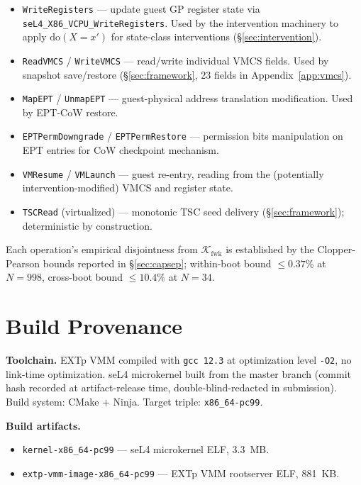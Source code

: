 \documentclass[conference]{IEEEtran}
\newcommand{\Kfwk}{\mathcal{K}_\text{fwk}}
\newcommand{\dox}[1]{\text{do}(X{=}#1)}
\begin{document}
\begin{itemize}[itemsep=2pt,topsep=2pt,leftmargin=*]
\item \texttt{WriteRegisters} --- update guest GP register state
  via \texttt{seL4\_X86\_VCPU\_WriteRegisters}. Used by the
  intervention machinery to apply $\dox{x'}$ for state-class
  interventions (\S\ref{sec:intervention}).
\item \texttt{ReadVMCS} / \texttt{WriteVMCS} --- read/write
  individual VMCS fields. Used by snapshot save/restore
  (\S\ref{sec:framework}, 23 fields in Appendix~\ref{app:vmcs}).
\item \texttt{MapEPT} / \texttt{UnmapEPT} --- guest-physical
  address translation modification. Used by EPT-CoW restore.
\item \texttt{EPTPermDowngrade} / \texttt{EPTPermRestore} ---
  permission bits manipulation on EPT entries for CoW
  checkpoint mechanism.
\item \texttt{VMResume} / \texttt{VMLaunch} --- guest re-entry,
  reading from the (potentially intervention-modified) VMCS and
  register state.
\item \texttt{TSCRead} (virtualized) --- monotonic TSC seed
  delivery (\S\ref{sec:framework}); deterministic by construction.
\end{itemize}

Each operation's empirical disjointness from $\Kfwk$ is established
by the Clopper-Pearson bounds reported in \S\ref{sec:capsep};
within-boot bound $\leq 0.37\%$ at $N{=}998$, cross-boot bound
$\leq 10.4\%$ at $N{=}34$.

\section{Build Provenance}\label{app:build}

\textbf{Toolchain.} EXTp VMM compiled with \texttt{gcc 12.3} at
optimization level \texttt{-O2}, no link-time optimization.
seL4 microkernel built from the master branch (commit hash
recorded at artifact-release time, double-blind-redacted in
submission). Build system: CMake + Ninja. Target triple:
\texttt{x86\_64-pc99}.

\textbf{Build artifacts.}
\begin{itemize}[itemsep=2pt,topsep=2pt,leftmargin=*]
\item \texttt{kernel-x86\_64-pc99} --- seL4 microkernel ELF, 3.3~MB.
\item \texttt{extp-vmm-image-x86\_64-pc99} --- EXTp VMM rootserver
  ELF, 881~KB.
\end{itemize}
\end{document}
